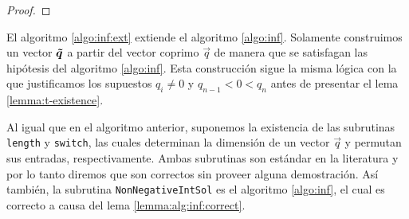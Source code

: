 \begin{proof}
\end{proof}

El algoritmo \ref{algo:inf:ext} extiende el algoritmo \ref{algo:inf}. Solamente construimos un
vector $\boldsymbol{\tilde{q}}$ a partir del vector coprimo $\vec{q}$ de manera que se satisfagan las
hipótesis del algoritmo \ref{algo:inf}. Esta construcción sigue la misma lógica con la que
justificamos los supuestos $q_i \neq 0$ y $q_{n-1} < 0 < q_n$ antes de presentar el lema
\ref{lemma:t-existence}.

Al igual que en el algoritmo anterior, suponemos la existencia de las subrutinas \texttt{length} y
\texttt{switch}, las cuales determinan la dimensión de un vector $\vec{q}$ y permutan sus entradas,
respectivamente. Ambas subrutinas son estándar en la literatura y por lo tanto diremos que son
correctos sin proveer alguna demostración. Así también, la subrutina \texttt{NonNegativeIntSol} es
el algoritmo \ref{algo:inf}, el cual es correcto a causa del lema \ref{lemma:alg:inf:correct}.

